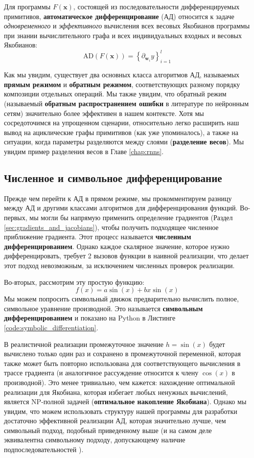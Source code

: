 \begin{definition} \addbottle
%
Для программы $F(\mathbf{x})$, состоящей из последовательности дифференцируемых примитивов, \textbf{автоматическое дифференцирование} (АД) относится к задаче \textit{одновременного} и \textit{эффективного} вычисления всех весовых Якобианов программы при знании вычислительного графа и всех индивидуальных входных и весовых Якобианов:
%
$$\text{AD}(F(\mathbf{x}))=\left\{\partial_{\mathbf{w}_i} y\right\}_{i=1}^{l}$$
\end{definition}
%
Как мы увидим, существует два основных класса алгоритмов АД, называемых \textbf{прямым режимом} и \textbf{обратным режимом}, соответствующих разному порядку композиции отдельных операций. Мы также увидим, что обратный режим (называемый \textbf{обратным распространением ошибки} в литературе по нейронным сетям) значительно более эффективен в нашем контексте. Хотя мы сосредоточимся на упрощенном сценарии, относительно легко расширить наш вывод на ациклические графы примитивов (как уже упоминалось), а также на ситуации, когда параметры разделяются между слоями (\textbf{разделение весов}). Мы увидим пример разделения весов в Главе \ref{chap:rnns}.

\subsection{Численное и символьное дифференцирование}

\addteacup Прежде чем перейти к АД в прямом режиме, мы прокомментируем разницу между АД и другими классами алгоритмов для дифференцирования функций. Во-первых, мы могли бы напрямую применить определение градиентов (Раздел \ref{sec:gradients_and_jacobians}), чтобы получить подходящее численное приближение градиента. Этот процесс называется \textbf{численным дифференцированием}. Однако каждое скалярное значение, которое нужно дифференцировать, требует 2 вызовов функции в наивной реализации, что делает этот подход невозможным, за исключением численных проверок реализации.

Во-вторых, рассмотрим эту простую функцию:
%
$$
f(x)=a\sin(x)+bx\sin(x)
$$
%
Мы можем попросить символьный движок предварительно вычислить полное, символьное уравнение производной. Это называется \textbf{символьным дифференцированием} и показано на Python в Листинге \ref{code:symbolic_differentiation}.

В реалистичной реализации промежуточное значение $h=\sin(x)$ будет вычислено только один раз и сохранено в промежуточной переменной, которая также может быть повторно использована для соответствующего вычисления в трассе градиента (и аналогичное рассуждение относится к члену $\cos(x)$ в производной). Это менее тривиально, чем кажется: нахождение оптимальной реализации для Якобиана, которая избегает любых ненужных вычислений, является NP-полной задачей (\textbf{оптимальное накопление Якобиана}). Однако мы увидим, что можем использовать структуру нашей программы для разработки достаточно эффективной реализации АД, которая значительно лучше, чем символьный подход, подобный приведенному выше (и на самом деле эквивалентна символьному подходу, допускающему наличие подпоследовательностей \cite{laue2019equivalence}).

